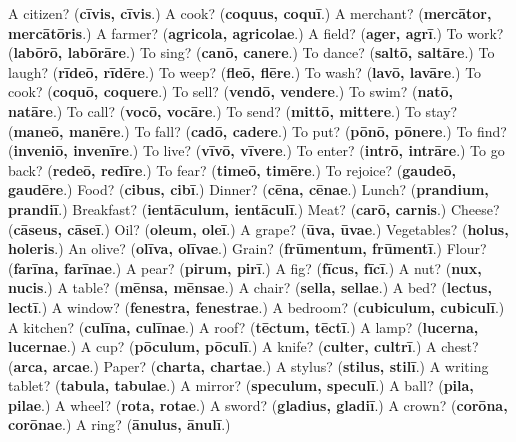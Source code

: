 \begin{tcolorbox}[breakable,colback=teal!4,colframe=teal!35!black,title={Before you move on}]
A citizen? (\textbf{cīvis, cīvis}.) A cook? (\textbf{coquus, coquī}.) A merchant? (\textbf{mercātor, mercātōris}.) A farmer? (\textbf{agricola, agricolae}.) A field? (\textbf{ager, agrī}.) To work? (\textbf{labōrō, labōrāre}.) To sing? (\textbf{canō, canere}.) To dance? (\textbf{saltō, saltāre}.) To laugh? (\textbf{rīdeō, rīdēre}.) To weep? (\textbf{fleō, flēre}.) To wash? (\textbf{lavō, lavāre}.) To cook? (\textbf{coquō, coquere}.) To sell? (\textbf{vendō, vendere}.) To swim? (\textbf{natō, natāre}.) To call? (\textbf{vocō, vocāre}.) To send? (\textbf{mittō, mittere}.) To stay? (\textbf{maneō, manēre}.) To fall? (\textbf{cadō, cadere}.) To put? (\textbf{pōnō, pōnere}.) To find? (\textbf{inveniō, invenīre}.) To live? (\textbf{vīvō, vīvere}.) To enter? (\textbf{intrō, intrāre}.) To go back? (\textbf{redeō, redīre}.) To fear? (\textbf{timeō, timēre}.) To rejoice? (\textbf{gaudeō, gaudēre}.) Food? (\textbf{cibus, cibī}.) Dinner? (\textbf{cēna, cēnae}.) Lunch? (\textbf{prandium, prandiī}.) Breakfast? (\textbf{ientāculum, ientāculī}.) Meat? (\textbf{carō, carnis}.) Cheese? (\textbf{cāseus, cāseī}.) Oil? (\textbf{oleum, oleī}.) A grape? (\textbf{ūva, ūvae}.) Vegetables? (\textbf{holus, holeris}.) An olive? (\textbf{olīva, olīvae}.) Grain? (\textbf{frūmentum, frūmentī}.) Flour? (\textbf{farīna, farīnae}.) A pear? (\textbf{pirum, pirī}.) A fig? (\textbf{fīcus, fīcī}.) A nut? (\textbf{nux, nucis}.) A table? (\textbf{mēnsa, mēnsae}.) A chair? (\textbf{sella, sellae}.) A bed? (\textbf{lectus, lectī}.) A window? (\textbf{fenestra, fenestrae}.) A bedroom? (\textbf{cubiculum, cubiculī}.) A kitchen? (\textbf{culīna, culīnae}.) A roof? (\textbf{tēctum, tēctī}.) A lamp? (\textbf{lucerna, lucernae}.) A cup? (\textbf{pōculum, pōculī}.) A knife? (\textbf{culter, cultrī}.) A chest? (\textbf{arca, arcae}.) Paper? (\textbf{charta, chartae}.) A stylus? (\textbf{stilus, stilī}.) A writing tablet? (\textbf{tabula, tabulae}.) A mirror? (\textbf{speculum, speculī}.) A ball? (\textbf{pila, pilae}.) A wheel? (\textbf{rota, rotae}.) A sword? (\textbf{gladius, gladiī}.) A crown? (\textbf{corōna, corōnae}.) A ring? (\textbf{ānulus, ānulī}.)
\end{tcolorbox}
